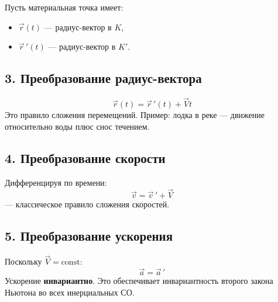 \documentclass[a4paper,12pt]{article}
\begin{document}
Пусть материальная точка имеет:
\begin{itemize}
    \item $\vec{r}(t)$ — радиус-вектор в $K$,
    \item $\vec{r}\,'(t)$ — радиус-вектор в $K'$.
\end{itemize}

\subsection*{3. Преобразование радиус-вектора}
\[
\boxed{\vec{r}(t) = \vec{r}\,'(t) + \vec{V} t}
\]
Это правило сложения перемещений. Пример: лодка в реке — движение относительно воды плюс снос течением.

\subsection*{4. Преобразование скорости}
Дифференцируя по времени:
\[
\boxed{\vec{v} = \vec{v}\,' + \vec{V}}
\]
— классическое правило сложения скоростей.

\subsection*{5. Преобразование ускорения}
Поскольку $\vec{V} = \text{const}$:
\[
\boxed{\vec{a} = \vec{a}\,'}
\]
Ускорение \textbf{инвариантно}. Это обеспечивает инвариантность второго закона Ньютона во всех инерциальных СО.
\end{document}
